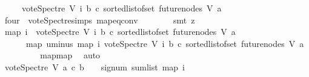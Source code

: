 \begin{isabellebody}
\ \ \ \ {\isacharparenleft}{\kern0pt}{\isacharminus}{\kern0pt}\ vote{\isacharunderscore}{\kern0pt}Spectre\ V\ i\ b\ c{\isacharparenright}{\kern0pt}{\isacharparenright}{\kern0pt}\ {\isacharparenleft}{\kern0pt}sorted{\isacharunderscore}{\kern0pt}list{\isacharunderscore}{\kern0pt}of{\isacharunderscore}{\kern0pt}set\ {\isacharparenleft}{\kern0pt}future{\isacharunderscore}{\kern0pt}nodes\ V\ a{\isacharparenright}{\kern0pt}{\isacharparenright}{\kern0pt}{\isacharparenright}{\kern0pt}{\isacharparenright}{\kern0pt}{\isachardoublequoteclose}\ \isanewline
\ \ \ \ \ \ \isamarkupfalse%
\ four\ {}\ vote{\isacharunderscore}{\kern0pt}Spectre{\isachardot}{\kern0pt}simps\ map{\isacharunderscore}{\kern0pt}eq{\isacharunderscore}{\kern0pt}conv\isanewline
\ \ \ \ \ \ \isamarkupfalse%
\ {\isacharparenleft}{\kern0pt}smt\ {\isacharparenleft}{\kern0pt}z{}{\isacharparenright}{\kern0pt}{\isacharparenright}{\kern0pt}\ \isanewline
\ \ \ \ \isamarkupfalse%
\ {\isachardoublequoteopen}{\isacharparenleft}{\kern0pt}map\ {\isacharparenleft}{\kern0pt}{\isasymlambda}i{\isachardot}{\kern0pt}\ {\isacharminus}{\kern0pt}\ vote{\isacharunderscore}{\kern0pt}Spectre\ V\ i\ b\ c{\isacharparenright}{\kern0pt}\ {\isacharparenleft}{\kern0pt}sorted{\isacharunderscore}{\kern0pt}list{\isacharunderscore}{\kern0pt}of{\isacharunderscore}{\kern0pt}set\ {\isacharparenleft}{\kern0pt}future{\isacharunderscore}{\kern0pt}nodes\ V\ a{\isacharparenright}{\kern0pt}{\isacharparenright}{\kern0pt}{\isacharparenright}{\kern0pt}\isanewline
\ \ \ \ \ {\isacharequal}{\kern0pt}\ {\isacharparenleft}{\kern0pt}map\ uminus\ {\isacharparenleft}{\kern0pt}map\ {\isacharparenleft}{\kern0pt}{\isasymlambda}i{\isachardot}{\kern0pt}\ vote{\isacharunderscore}{\kern0pt}Spectre\ V\ i\ b\ c{\isacharparenright}{\kern0pt}\ {\isacharparenleft}{\kern0pt}sorted{\isacharunderscore}{\kern0pt}list{\isacharunderscore}{\kern0pt}of{\isacharunderscore}{\kern0pt}set\ {\isacharparenleft}{\kern0pt}future{\isacharunderscore}{\kern0pt}nodes\ V\ a{\isacharparenright}{\kern0pt}{\isacharparenright}{\kern0pt}{\isacharparenright}{\kern0pt}{\isacharparenright}{\kern0pt}{\isachardoublequoteclose}\ \isanewline
\ \ \ \ \ \ \isamarkupfalse%
\ map{\isacharunderscore}{\kern0pt}map\ \isamarkupfalse%
\ auto\ \ \ \ \ \ \ \isanewline
\ \ \ \ \isamarkupfalse%
\ \isamarkupfalse%
\ {\isachardoublequoteopen}vote{\isacharunderscore}{\kern0pt}Spectre\ V\ a\ c\ b\ {\isacharequal}{\kern0pt}\ {\isacharminus}{\kern0pt}\ {\isacharparenleft}{\kern0pt}\ signum\ {\isacharparenleft}{\kern0pt}sum{\isacharunderscore}{\kern0pt}list\ {\isacharparenleft}{\kern0pt}map\ {\isacharparenleft}{\kern0pt}{\isasymlambda}i{\isachardot}{\kern0pt}\isanewline

\end{isabellebody}
